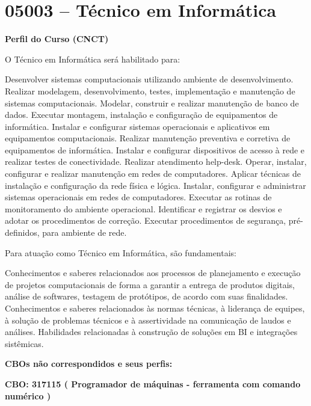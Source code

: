 \documentclass[
]{article}
\begin{document}
\newpage
\section{ 05003 -- Técnico em Informática }

\textbf{Perfil do Curso (CNCT)}

O Técnico em Informática será habilitado para:

Desenvolver sistemas computacionais utilizando ambiente de
desenvolvimento. Realizar modelagem, desenvolvimento, testes,
implementação e manutenção de sistemas computacionais. Modelar,
construir e realizar manutenção de banco de dados. Executar montagem,
instalação e configuração de equipamentos de informática. Instalar e
configurar sistemas operacionais e aplicativos em equipamentos
computacionais. Realizar manutenção preventiva e corretiva de
equipamentos de informática. Instalar e configurar dispositivos de
acesso à rede e realizar testes de conectividade. Realizar atendimento
help-desk. Operar, instalar, configurar e realizar manutenção em redes
de computadores. Aplicar técnicas de instalação e configuração da rede
física e lógica. Instalar, configurar e administrar sistemas
operacionais em redes de computadores. Executar as rotinas de
monitoramento do ambiente operacional. Identificar e registrar os
desvios e adotar os procedimentos de correção. Executar procedimentos de
segurança, pré-definidos, para ambiente de rede.

Para atuação como Técnico em Informática, são fundamentais:

Conhecimentos e saberes relacionados aos processos de planejamento e
execução de projetos computacionais de forma a garantir a entrega de
produtos digitais, análise de softwares, testagem de protótipos, de
acordo com suas finalidades. Conhecimentos e saberes relacionados às
normas técnicas, à liderança de equipes, à solução de problemas técnicos
e à assertividade na comunicação de laudos e análises. Habilidades
relacionadas à construção de soluções em BI e integrações sistêmicas.

\textbf{CBOs não correspondidos e seus perfis:}

\textbf{CBO: 317115  ( Programador de máquinas - ferramenta com comando numérico )}
\end{document}
